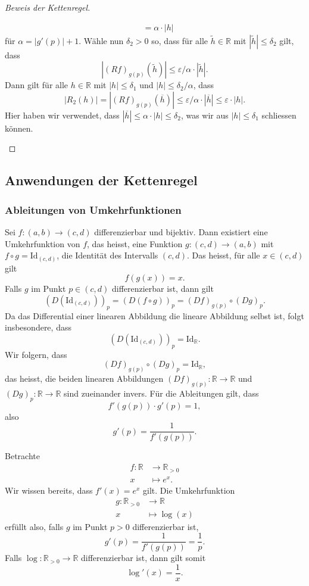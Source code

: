 \documentclass[../main.tex]{subfiles}
\begin{document}
\begin{proof}[Beweis der Kettenregel]
\begin{enumerate}[(1)]
\begin{align*}
         &= \alpha \cdot |h|
      \end{align*}
      für $\alpha = |g'(p)| + 1$.
      Wähle nun $\delta_2 > 0$ so,
      dass für alle $\widetilde h \in \mathbb{R}$
      mit $|\widetilde h| \leq \delta_2$ gilt,
      dass
      \[
        |{(Rf)}_{g(p)}(\widetilde h)| \leq \varepsilon/\alpha
        \cdot |\widetilde h|.
      \]
      Dann gilt für alle $h \in \mathbb{R}$ mit
      $|h| \leq \delta_1$ und $|h| \leq \delta_2/\alpha$,
      dass
      \[
        |R_2(h)| = |{(Rf)}_{g(p)}(\overline h)|
        \leq \varepsilon/\alpha \cdot |\overline h| \leq
        \varepsilon \cdot |h|.
      \]
      Hier haben wir verwendet, dass
      $|\overline h| \leq \alpha \cdot |h| \leq \delta_2$,
      was wir aus $|h| \leq \delta_1$ schliessen
      können. \qedhere
  \end{enumerate}
\end{proof}

\subsection*{Anwendungen der Kettenregel}
\subsubsection*{Ableitungen von Umkehrfunktionen}
Sei $f \colon (a, b) \to (c, d)$
differenzierbar und bijektiv.
Dann existiert eine Umkehrfunktion
von $f$, das heisst, eine Funktion
$g \colon (c, d) \to (a, b)$
mit $f \circ g = \text{Id}_{(c, d)}$,
die Identität des Intervalls
$(c, d)$. Das heisst, für alle
$x \in (c, d)$ gilt
\[
  f(g(x)) = x.
\]
Falls $g$ im Punkt $p \in (c, d)$
differenzierbar ist, dann gilt
\[
  {(D(\text{Id}_{(c, d)}))}_{p} =
  {(D(f \circ g))}_p
  = {(Df)}_{g(p)} \circ {(Dg)}_p.
\]
Da das Differential einer linearen Abbildung
die lineare Abbildung selbst ist,
folgt insbesondere, dass
\[
  {(D(\text{Id}_{(c, d)}))}_p = \text{Id}_{\mathbb{R}}.
\]
Wir folgern, dass
\[
  {(Df)}_{g(p)} \circ {(Dg)}_p = \text{Id}_{\mathbb{R}},
\]
das heisst, die beiden linearen Abbildungen
${(Df)}_{g(p)} \colon \mathbb{R} \to \mathbb{R}$
und ${(Dg)}_p \colon \mathbb{R} \to \mathbb{R}$
sind zueinander invers.
Für die Ableitungen gilt, dass
\[
  f'(g(p)) \cdot g'(p) = 1,
\]
also
\[
  g'(p) = \frac{1}{f'(g(p))}.
\]

\begin{example}
Betrachte
\begin{align*}
  f \colon \mathbb{R} & \to \mathbb{R}_{>0} \\
  x & \mapsto e^x.
\end{align*}
Wir wissen bereits, dass $f'(x) = e^x$ gilt.
Die Umkehrfunktion
\begin{align*}
  g \colon \mathbb{R}_{>0} & \to \mathbb{R} \\
  x & \mapsto \log(x)
\end{align*}
erfüllt also, falls $g$ im Punkt $p > 0$ differenzierbar ist,
\[
  g'(p) = \frac{1}{f'(g(p))} = \frac{1}{p}.
\]
Falls $\log \colon \mathbb{R}_{>0} \to \mathbb{R}$
differenzierbar ist, dann gilt somit
\[
  \log'(x) = \frac{1}{x}.
\]
\end{example}
\end{document}

